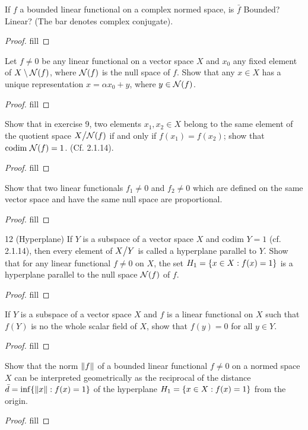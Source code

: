 \begin{exercise}{7}
If $f$ a bounded linear functional on a complex normed space, is $\bar{f}$ Bounded? Linear?
(The bar denotes complex conjugate).
\end{exercise}
\begin{proof}
fill
\end{proof}

\begin{exercise}{9}
Let $f\neq 0$ be any linear functional on a vector space $X$ and $x_0$ any fixed element of $X\setminus \mathcal{N}(f)$, where $\mathcal{N}(f)$ is the null space of $f$.
Show that any $x\in X$ has a unique representation $x=\alpha x_0+y$, where $y\in\mathcal{N}(f)$.
\end{exercise}
\begin{proof}
fill
\end{proof}

\begin{exercise}{10}
Show that in exercise 9, two elements $x_1,x_2\in X$ belong to the same element of the quotient space ${\textstyle X}\big/{\textstyle \mathcal{N}(f)}$ if and only if $f(x_1)=f(x_2)$;
show that $\text{codim }\mathcal{N}(f)=1$.
(Cf. 2.1.14).
\end{exercise}
\begin{proof}
fill
\end{proof}

\begin{exercise}{11}
Show that two linear functionals $f_1\neq 0$ and $f_2\neq 0$ which are defined on the same vector space and have the same null space are proportional.
\end{exercise}
\begin{proof}
fill
\end{proof}

\begin{exercise}{12 (Hyperplane)}
If $Y$ is a subspace of a vector space $X$ and $\text{codim }Y=1$ (cf. 2.1.14), then every element of ${\textstyle X}\big/{\textstyle Y}$ is called a hyperplane parallel to $Y$.
Show that for any linear functional $f\neq 0$ on $X$, the set $H_1=\{x\in X: f(x)=1\}$ is a hyperplane parallel to the null space $\mathcal{N}(f)$ of $f$.
\end{exercise}
\begin{proof}
fill
\end{proof}

\begin{exercise}{13}
If $Y$ is a subspace of a vector space $X$ and $f$ is a linear functional on $X$ such that $f(Y)$ is no the whole scalar field of $X$, show that $f(y)=0$ for all $y\in Y$.
\end{exercise}
\begin{proof}
fill
\end{proof}

\begin{exercise}{14}
Show that the norm $\left\lVert f\right\rVert$ of a bounded linear functional $f\neq 0$ on a normed space $X$ can be interpreted geometrically as the reciprocal of the distance $\bar{d}=\inf\{\left\lVert x\right\rVert: f(x)=1\}$ of the hyperplane $H_1=\{x\in X: f(x)=1\}$ from the origin.
\end{exercise}
\begin{proof}
fill
\end{proof}